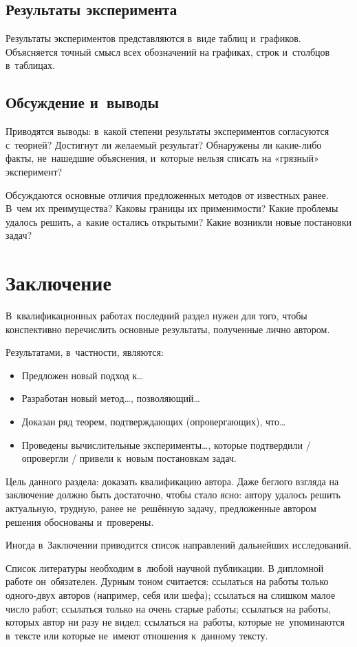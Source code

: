 \documentclass[12pt, fleqn]{article}
\begin{document}
\subsection{Результаты эксперимента}
Результаты экспериментов представляются в~виде таблиц и~графиков. 
Объясняется точный смысл всех обозначений на графиках, строк и~столбцов в~таблицах. 

\subsection{Обсуждение и~выводы}
Приводятся выводы: 
в~какой степени результаты экспериментов согласуются с~теорией? 
Достигнут ли желаемый результат? 
Обнаружены ли какие-либо факты, не~нашедшие объяснения, и~которые нельзя списать на «грязный» эксперимент?

Обсуждаются основные отличия предложенных методов от известных ранее. 
В~чем их преимущества? 
Каковы границы их применимости? 
Какие проблемы удалось решить, а~какие остались открытыми? 
Какие возникли новые постановки задач?

\section{Заключение}

В~квалификационных работах последний раздел нужен для того, чтобы 
конспективно перечислить основные результаты, полученные лично автором. 

Результатами, в~частности, являются:
\begin{itemize}
\item 
    Предложен новый подход к\dots
\item 
    Разработан новый метод\dots, позволяющий\dots
\item 
    Доказан ряд теорем, подтверждающих (опровергающих), что\dots
\item 
    Проведены вычислительные эксперименты\dots,
    которые подтвердили / опровергли / привели к~новым постановкам задач.
\end{itemize}
    
Цель данного раздела: доказать квалификацию автора. 
Даже беглого взгляда на заключение должно быть достаточно, чтобы стало ясно: 
автору удалось решить актуальную, трудную, ранее не~решённую задачу, 
предложенные автором решения обоснованы и~проверены.

Иногда в~Заключении приводится список направлений дальнейших исследований.

\newpage
Список литературы необходим в~любой научной публикации. 
В дипломной работе он~обязателен. 
Дурным тоном считается:
ссылаться на работы только одного-двух авторов (например, себя или шефа);
ссылаться на слишком малое число работ;
ссылаться только на очень старые работы;
ссылаться на работы, которых автор ни разу не видел;
ссылаться на~работы, которые не~упоминаются в~тексте
или которые не~имеют отношения к~данному тексту.
\end{document}
